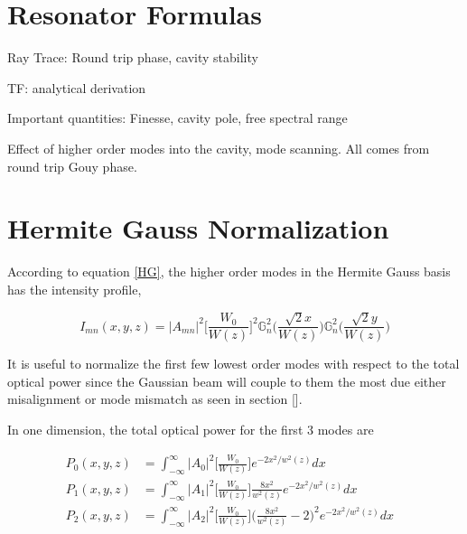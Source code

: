 \documentclass[oneside]{book}
\begin{document}
\begin{appendices}

	\chapter{Resonator Formulas}
	
	
	Ray Trace: Round trip phase, cavity stability
	
	TF: analytical derivation
	
	Important quantities: Finesse, cavity pole, free spectral range
	
	Effect of higher order modes into the cavity, mode scanning. All comes from round trip Gouy phase.
	
	
	\chapter{Hermite Gauss Normalization}
	According to equation \ref{HG}, the higher order modes in the Hermite Gauss basis has the intensity profile,
	
	\begin{equation}
		I_{mn} (x,y,z) = \vert A_{mn} \vert^2 \bigg[ \frac{W_0}{W(z)} \bigg]^2  \mathbb{G}^2_n\Bigg( \frac{\sqrt{2}x}{W(z)} \Bigg) \mathbb{G}^2_n\Bigg( \frac{\sqrt{2}y}{W(z)} \Bigg)
	\end{equation}

	It is useful to normalize the first few lowest order modes with respect to the total optical power since the Gaussian beam will couple to them the most due either misalignment or mode mismatch as seen in section [].
	
	In one dimension, the total optical power for the first 3 modes are
	
	\begin{equation}
	\label{HGNormalInt1D}
	\begin{aligned}
		P_{0}(x,y,z) 	& 	=	\int_{-\infty}^{\infty}  \vert A_{0} \vert^2   \bigg[ \frac{W_0}{W(z)} \bigg] e^{-2x^2/w^2(z)} dx	&
	\\	P_{1}(x,y,z)	&	=	\int_{-\infty}^{\infty}  \vert A_{1} \vert^2  \bigg[ \frac{W_0}{W(z)} \bigg] \frac{8x^2}{w^2(z)} 	
								e^{-2x^2/w^2(z)}dx &
	\\	P_{2}(x,y,z)	&	= 	\int_{-\infty}^{\infty}  \vert A_{2} \vert^2   \bigg[ \frac{W_0}{W(z)} \bigg] \bigg(\frac{8x^2}{w^2(z)}	-2\bigg)^2e^{-2x^2/w^2(z)}dx
	\end{aligned}
	\end{equation}
	

\end{appendices}
\end{document}
